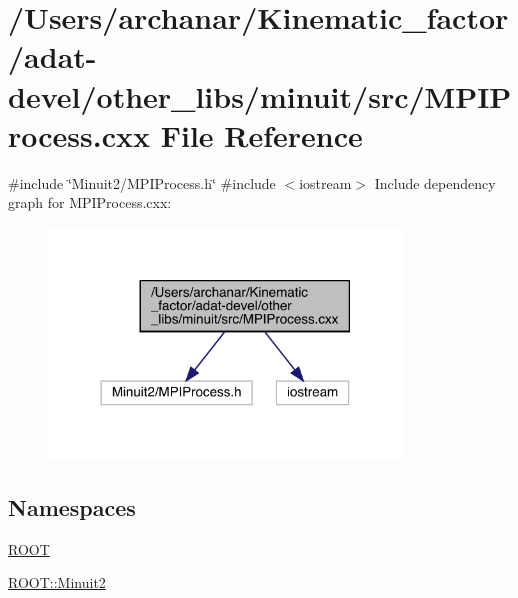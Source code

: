 \hypertarget{adat-devel_2other__libs_2minuit_2src_2MPIProcess_8cxx}{}\section{/\+Users/archanar/\+Kinematic\+\_\+factor/adat-\/devel/other\+\_\+libs/minuit/src/\+M\+P\+I\+Process.cxx File Reference}
\label{adat-devel_2other__libs_2minuit_2src_2MPIProcess_8cxx}
{\ttfamily \#include \char`\"{}Minuit2/\+M\+P\+I\+Process.\+h\char`\"{}}\newline
{\ttfamily \#include $<$iostream$>$}\newline
Include dependency graph for M\+P\+I\+Process.\+cxx\+:
\nopagebreak
\begin{figure}[H]
\begin{center}
\leavevmode
\includegraphics[width=266pt]{d3/d21/adat-devel_2other__libs_2minuit_2src_2MPIProcess_8cxx__incl}
\end{center}
\end{figure}
\subsection*{Namespaces}
\begin{DoxyCompactItemize}
\item 
 \mbox{\hyperlink{namespaceROOT}{R\+O\+OT}}
\item 
 \mbox{\hyperlink{namespaceROOT_1_1Minuit2}{R\+O\+O\+T\+::\+Minuit2}}
\end{DoxyCompactItemize}
